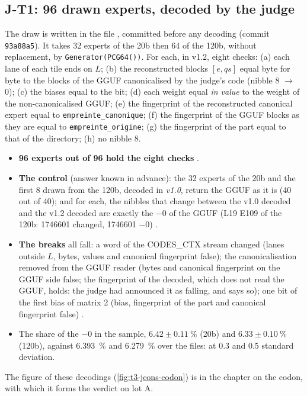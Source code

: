 \subsection{J-T1: 96 drawn experts, decoded by the judge}\label{t3jug:sec:jt1}

The draw is written in the file , committed before any decoding (commit \texttt{93a88a5}). It takes 32 experts of the 20b then 64 of the 120b, without replacement, by \texttt{Generator(\allowbreak PCG64())}. For each, in v1.2, eight checks: (a) each lane of each tile ends on $L$; (b) the reconstructed blocks $[e, qs]$ equal byte for byte to the blocks of the GGUF canonicalised by the judge's code (nibble 8 $\to$ 0); (c) the biases equal to the bit; (d) each weight equal \emph{in value} to the weight of the non-canonicalised GGUF; (e) the fingerprint of the reconstructed canonical expert equal to \texttt{empreinte\_canonique}; (f) the fingerprint of the GGUF blocks as they are equal to \texttt{empreinte\_origine}; (g) the fingerprint of the part equal to that of the directory; (h) no nibble 8.

\begin{itemize}
\item \textbf{96 experts out of 96 hold the eight checks} \mes.
\item \textbf{The control} (answer known in advance): the 32 experts of the 20b and the first 8 drawn from the 120b, decoded in \emph{v1.0}, return the GGUF as it is (40 out of 40); and for each, the nibbles that change between the v1.0 decoded and the v1.2 decoded are exactly the $-0$ of the GGUF (L19 E109 of the 120b: \num{1746601} changed, \num{1746601} $-0$) \mes.
\item \textbf{The breaks} all fall: a word of the CODES\_CTX stream changed (lanes outside $L$, bytes, values and canonical fingerprint false); the canonicalisation removed from the GGUF reader (bytes and canonical fingerprint on the GGUF side false; the fingerprint of the decoded, which does not read the GGUF, holds: the judge had announced it as falling, and says so); one bit of the first bias of matrix 2 (bias, fingerprint of the part and canonical fingerprint false) \mes.
\item The share of the $-0$ in the sample, $\num{6.42} \pm \SI{0.11}{\percent}$ (20b) and $\num{6.33} \pm \SI{0.10}{\percent}$ (120b), against \SI{6.393}{\percent} and \SI{6.279}{\percent} over the files: at \num{0.3} and \num{0.5} standard deviation.
\end{itemize}
The figure of these decodings (\cref{fig:t3-jcons-codon}) is in the chapter on the codon, with which it forms the verdict on lot A.

